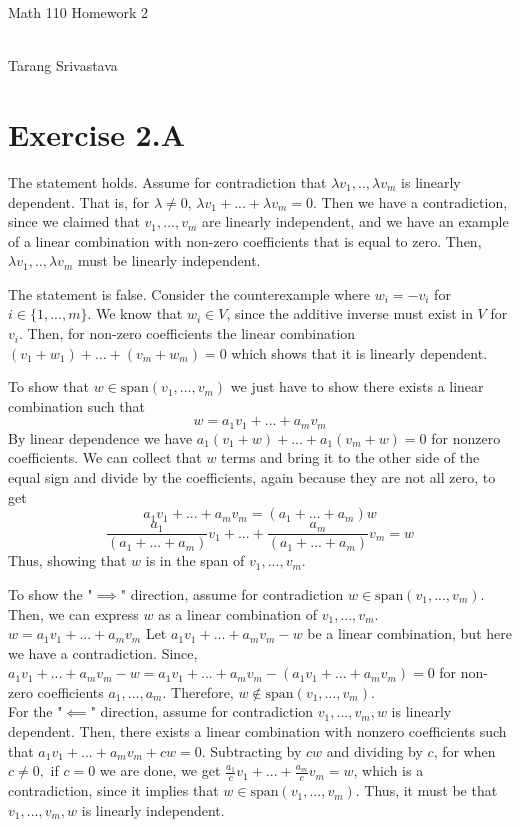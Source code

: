 \documentclass[10pt, twocolumn]{article}
\author{Tarang Srivastava}
\newcommand{\vspan}{\text{span}}
\newcommand{\makechaptertitle}[1]{
\begin{center}
	\begin{large}
		#1
	\end{large}
	\begin{small}
		\\Tarang Srivastava
	\end{small}
\end{center}
}
\begin{document}
	
\makechaptertitle{Math 110 Homework 2}

\section{Exercise 2.A}
\begin{q}[Problem 8]
    The statement holds. 
    Assume for contradiction that $ \lambda v_1, .., \lambda v_m $ is linearly dependent. 
    That is, for $ \lambda \neq 0 $, $ \lambda v_1 +  ... + \lambda v_m = 0 $. 
    Then we have a contradiction, since we claimed that $ v_1, ..., v_m $ are linearly independent,
    and we have an example of a linear combination with non-zero coefficients that is equal to zero. 
    Then, $ \lambda v_1, .., \lambda v_m $ must be linearly independent.
\end{q}
\begin{q}[Problem 9]
    The statement is false. 
    Consider the counterexample where $ w_i = -v_i $ for $ i \in \{1, ..., m\} $. 
    We know that $ w_i \in V $, since the additive inverse must exist in $ V $ for $ v_i $. 
    Then, for non-zero coefficients the linear combination $ (v_1 + w_1) +  ... + (v_m + w_m) = 0 $ 
    which shows that it is linearly dependent.
\end{q}
\begin{q}[Problem 10]
    To show that $ w \in \vspan(v_1, ..., v_m) $ we just have to show there exists a linear combination 
    such that $$ w = a_1v_1 + ...+ a_m v_m $$ 
    By linear dependence we have $ a_1(v_1 + w) + ... + a_1(v_m + w) = 0 $ for nonzero coefficients. 
    We can collect that $ w $ terms and bring it to the other side of the equal sign and divide by the coefficients, again because they are not all zero, to get
    $$ a_1 v_1 + ... + a_m v_m = (a_1 + ... + a_m) w $$ 
    $$ \frac{a_1}{(a_1 + ... + a_m)} v_1 + ... + \frac{a_m}{(a_1 + ... + a_m)} v_m = w $$
    Thus, showing that $ w $ is in the span of $ v_1, ..., v_m $. 
\end{q}
\begin{q}[Problem 11]
    To show the "$ \implies $" direction, assume for contradiction $ w \in \vspan(v_1, ..., v_m) $.
    Then, we can express $ w $ as a linear combination of $ v_1, ..., v_m $. 
    $ w = a_1 v_1 + ... + a_m v_m $
    Let $ a_1 v_1 + ... + a_m v_m - w $ be a linear combination, but here we have a contradiction. 
    Since, 
    $ a_1 v_1 + ... + a_m v_m - w = a_1 v_1 + ... + a_m v_m - (a_1 v_1 + ... + a_m v_m) = 0 $
    for non-zero coefficients $ a_1, ..., a_m $. 
    Therefore, $ w \not\in \vspan(v_1, ..., v_m) $. \\
    For the "$ \impliedby $" direction, assume for contradiction $ v_1, ..., v_m, w $ is linearly dependent. 
    Then, there exists a linear combination with nonzero coefficients such that
    $ a_1v_1 + ... + a_m v_m + cw = 0 $. 
    Subtracting by $ cw $ and dividing by $ c $, for when $ c \neq 0, $ if $ c = 0 $ we are done, 
    we get $ \frac{a_1}{c} v_1 + ... + \frac{a_m}{c} v_m = w $, which is a contradiction, since it implies that $ w \in \vspan(v_1, ..., v_m) $. 
    Thus, it must be that $ v_1, ..., v_m, w $ is linearly independent.
\end{q}
\end{document}

